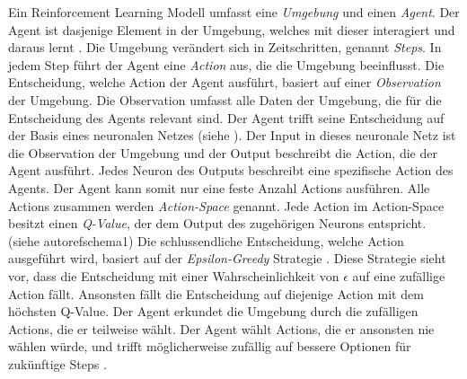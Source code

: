 Ein Reinforcement Learning Modell umfasst eine \emph{Umgebung} und einen
\emph{Agent}. Der Agent ist dasjenige Element in der Umgebung, welches mit
dieser interagiert und daraus lernt \cite[S. 53]{sutton_reinforcement_2014}. Die
Umgebung verändert sich in Zeitschritten, genannt \emph{Steps}. In jedem Step
führt der Agent eine \emph{Action} aus, die die Umgebung beeinflusst. Die
Entscheidung, welche Action der Agent ausführt, basiert auf einer
\emph{Observation} \cite[S. 2]{mnih_playing_nodate} der Umgebung. Die
Observation umfasst alle Daten der Umgebung, die für die Entscheidung des Agents
relevant sind. Der Agent trifft seine Entscheidung auf der Basis eines
neuronalen Netzes (siehe ). Der Input in dieses neuronale
Netz ist die Observation der Umgebung und der Output beschreibt die Action, die
der Agent ausführt. Jedes Neuron des Outputs beschreibt eine spezifische Action
des Agents. Der Agent kann somit nur eine feste Anzahl Actions ausführen. Alle
Actions zusammen werden \emph{Action-Space} \cite[S.
67]{sutton_reinforcement_2014} genannt. Jede Action im Action-Space besitzt
einen \emph{Q-Value}, der dem Output des zugehörigen Neurons entspricht. (siehe
autoref{schema1}) \cite{wang_deep_2021} Die schlussendliche Entscheidung, welche
Action ausgeführt wird, basiert auf der \emph{Epsilon-Greedy} Strategie \cite[S.
34]{sutton_reinforcement_2014}. Diese Strategie sieht vor, dass die Entscheidung
mit einer Wahrscheinlichkeit von $\epsilon$ auf eine zufällige Action fällt.
Ansonsten fällt die Entscheidung auf diejenige Action mit dem höchsten Q-Value.
Der Agent erkundet die Umgebung durch die zufälligen Actions, die er teilweise
wählt. Der Agent wählt Actions, die er ansonsten nie wählen würde, und trifft
möglicherweise zufällig auf bessere Optionen für zukünftige Steps
\cite{rajendra_koppula_exploration_nodate}.


